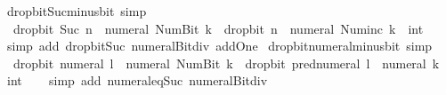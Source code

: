 \begin{isabellebody}
\ drop{\isacharunderscore}{\kern0pt}bit{\isacharunderscore}{\kern0pt}Suc{\isacharunderscore}{\kern0pt}minus{\isacharunderscore}{\kern0pt}bit{}\ {\isacharbrackleft}{\kern0pt}simp{\isacharbrackright}{\kern0pt}{\isacharcolon}{\kern0pt}\isanewline
\ \ {\isacartoucheopen}drop{\isacharunderscore}{\kern0pt}bit\ {\isacharparenleft}{\kern0pt}Suc\ n{\isacharparenright}{\kern0pt}\ {\isacharparenleft}{\kern0pt}{\isacharminus}{\kern0pt}\ numeral\ {\isacharparenleft}{\kern0pt}Num{\isachardot}{\kern0pt}Bit{}\ k{\isacharparenright}{\kern0pt}{\isacharparenright}{\kern0pt}\ {\isacharequal}{\kern0pt}\ drop{\isacharunderscore}{\kern0pt}bit\ n\ {\isacharparenleft}{\kern0pt}{\isacharminus}{\kern0pt}\ numeral\ {\isacharparenleft}{\kern0pt}Num{\isachardot}{\kern0pt}inc\ k{\isacharparenright}{\kern0pt}\ {\isacharcolon}{\kern0pt}{\isacharcolon}{\kern0pt}\ int{\isacharparenright}{\kern0pt}{\isacartoucheclose}\isanewline
%
\isadelimproof
\ \ %
\endisadelimproof
%
\isatagproof
{}\isamarkupfalse%
\ {\isacharparenleft}{\kern0pt}simp\ add{\isacharcolon}{\kern0pt}\ drop{\isacharunderscore}{\kern0pt}bit{\isacharunderscore}{\kern0pt}Suc\ numeral{\isacharunderscore}{\kern0pt}Bit{}{\isacharunderscore}{\kern0pt}div{\isacharunderscore}{\kern0pt}{}\ add{\isacharunderscore}{\kern0pt}One{\isacharparenright}{\kern0pt}%
\endisatagproof
{\isafoldproof}%
%
\isadelimproof
\isanewline
%
\endisadelimproof
\isanewline
{}\isamarkupfalse%
\ drop{\isacharunderscore}{\kern0pt}bit{\isacharunderscore}{\kern0pt}numeral{\isacharunderscore}{\kern0pt}minus{\isacharunderscore}{\kern0pt}bit{}\ {\isacharbrackleft}{\kern0pt}simp{\isacharbrackright}{\kern0pt}{\isacharcolon}{\kern0pt}\isanewline
\ \ {\isacartoucheopen}drop{\isacharunderscore}{\kern0pt}bit\ {\isacharparenleft}{\kern0pt}numeral\ l{\isacharparenright}{\kern0pt}\ {\isacharparenleft}{\kern0pt}{\isacharminus}{\kern0pt}\ numeral\ {\isacharparenleft}{\kern0pt}Num{\isachardot}{\kern0pt}Bit{}\ k{\isacharparenright}{\kern0pt}{\isacharparenright}{\kern0pt}\ {\isacharequal}{\kern0pt}\ drop{\isacharunderscore}{\kern0pt}bit\ {\isacharparenleft}{\kern0pt}pred{\isacharunderscore}{\kern0pt}numeral\ l{\isacharparenright}{\kern0pt}\ {\isacharparenleft}{\kern0pt}{\isacharminus}{\kern0pt}\ numeral\ k\ {\isacharcolon}{\kern0pt}{\isacharcolon}{\kern0pt}\ int{\isacharparenright}{\kern0pt}{\isacartoucheclose}\isanewline
%
\isadelimproof
\ \ %
\endisadelimproof
%
\isatagproof
{}\isamarkupfalse%
\ {\isacharparenleft}{\kern0pt}simp\ add{\isacharcolon}{\kern0pt}\ numeral{\isacharunderscore}{\kern0pt}eq{\isacharunderscore}{\kern0pt}Suc\ numeral{\isacharunderscore}{\kern0pt}Bit{}{\isacharunderscore}{\kern0pt}div{\isacharunderscore}{\kern0pt}{}{\isacharparenright}{\kern0pt}%

\end{isabellebody}
